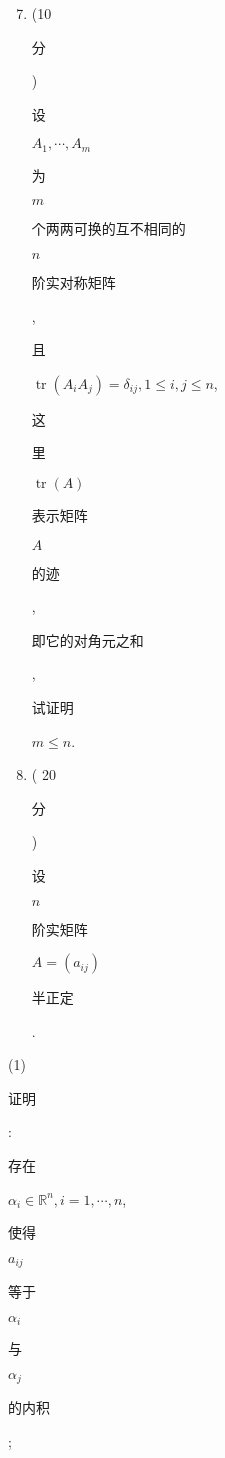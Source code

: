 \documentclass[10pt]{article}
\begin{document}
\begin{enumerate}
  \setcounter{enumi}{6}
  \item (10 \begin{CJK}{UTF8}{mj}分\end{CJK}) \begin{CJK}{UTF8}{mj}设\end{CJK} $A_{1}, \cdots, A_{m}$ \begin{CJK}{UTF8}{mj}为\end{CJK} $m$ \begin{CJK}{UTF8}{mj}个两两可换的互不相同的\end{CJK} $n$ \begin{CJK}{UTF8}{mj}阶实对称矩阵\end{CJK}, \begin{CJK}{UTF8}{mj}且\end{CJK} $\operatorname{tr}\left(A_{i} A_{j}\right)=\delta_{i j}, 1 \leq i, j \leq n$, \begin{CJK}{UTF8}{mj}这\end{CJK} \begin{CJK}{UTF8}{mj}里\end{CJK} $\operatorname{tr}(A)$ \begin{CJK}{UTF8}{mj}表示矩阵\end{CJK} $A$ \begin{CJK}{UTF8}{mj}的迹\end{CJK}, \begin{CJK}{UTF8}{mj}即它的对角元之和\end{CJK}, \begin{CJK}{UTF8}{mj}试证明\end{CJK} $m \leq n$.

  \item ( 20 \begin{CJK}{UTF8}{mj}分\end{CJK}) \begin{CJK}{UTF8}{mj}设\end{CJK} $n$ \begin{CJK}{UTF8}{mj}阶实矩阵\end{CJK} $A=\left(a_{i j}\right)$ \begin{CJK}{UTF8}{mj}半正定\end{CJK}.

\end{enumerate}
(1) \begin{CJK}{UTF8}{mj}证明\end{CJK}: \begin{CJK}{UTF8}{mj}存在\end{CJK} $\alpha_{i} \in \mathbb{R}^{n}, i=1, \cdots, n$, \begin{CJK}{UTF8}{mj}使得\end{CJK} $a_{i j}$ \begin{CJK}{UTF8}{mj}等于\end{CJK} $\alpha_{i}$ \begin{CJK}{UTF8}{mj}与\end{CJK} $\alpha_{j}$ \begin{CJK}{UTF8}{mj}的内积\end{CJK};
\end{document}
